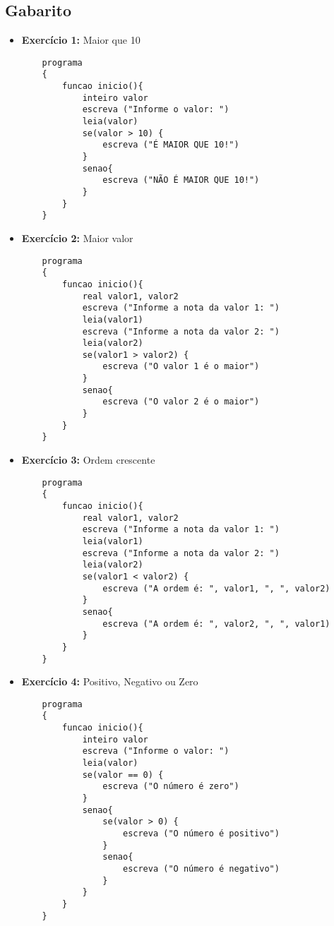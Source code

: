 \documentclass{article}
\begin{document}
\subsection*{Gabarito}
\begin{itemize}
    \item \textbf{Exercício 1:} Maior que 10
    \begin{lstlisting}
    programa
    {
        funcao inicio(){
            inteiro valor
            escreva ("Informe o valor: ")
            leia(valor)
            se(valor > 10) {
                escreva ("É MAIOR QUE 10!")
            }
            senao{
                escreva ("NÃO É MAIOR QUE 10!")
            }
        }
    }
    \end{lstlisting}

    \item \textbf{Exercício 2:} Maior valor
    \begin{lstlisting}
    programa
    {
        funcao inicio(){
            real valor1, valor2
            escreva ("Informe a nota da valor 1: ")
            leia(valor1)
            escreva ("Informe a nota da valor 2: ")
            leia(valor2)
            se(valor1 > valor2) {
                escreva ("O valor 1 é o maior")
            }
            senao{
                escreva ("O valor 2 é o maior")
            }
        }
    }
    \end{lstlisting}

    \item \textbf{Exercício 3:} Ordem crescente
    \begin{lstlisting}
    programa
    {
        funcao inicio(){
            real valor1, valor2
            escreva ("Informe a nota da valor 1: ")
            leia(valor1)
            escreva ("Informe a nota da valor 2: ")
            leia(valor2)
            se(valor1 < valor2) {
                escreva ("A ordem é: ", valor1, ", ", valor2)
            }
            senao{
                escreva ("A ordem é: ", valor2, ", ", valor1)
            }
        }
    }
    \end{lstlisting}

    \item \textbf{Exercício 4:} Positivo, Negativo ou Zero
    \begin{lstlisting}
    programa
    {
        funcao inicio(){
            inteiro valor
            escreva ("Informe o valor: ")
            leia(valor)
            se(valor == 0) {
                escreva ("O número é zero")
            }
            senao{
                se(valor > 0) {
                    escreva ("O número é positivo")
                }
                senao{
                    escreva ("O número é negativo")
                }
            }
        }
    }
    \end{lstlisting}


\end{itemize}
\end{document}
